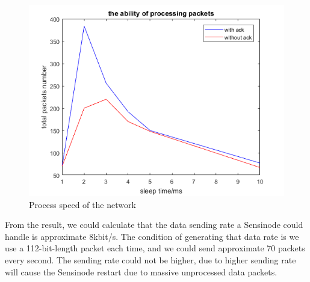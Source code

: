 \begin{figure}
    \centering
    \includegraphics{Figures/processability.png}
    \caption{Process speed of the network}
    \label{fig:processability}
\end{figure}

From the result, we could calculate that the data sending rate a Sensinode could handle is approximate 8kbit/s. The condition of generating that data rate is we use a 112-bit-length packet each time, and we could send approximate 70 packets every second. The sending rate could not be higher, due to higher sending rate will cause the Sensinode restart due to massive unprocessed data packets.
